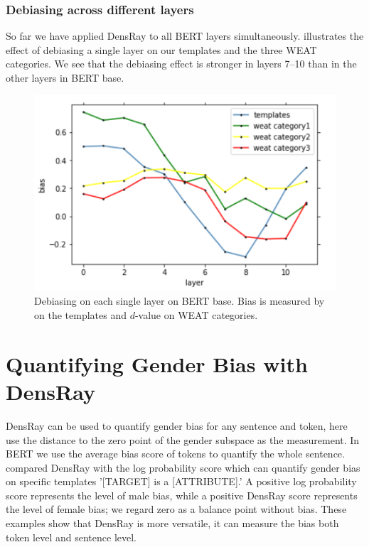 \subsubsection{Debiasing across different layers}
So far we have applied DensRay to all BERT layers simultaneously.
    illustrates the effect of
 debiasing a single  layer on our templates and the three
 WEAT categories. We see that the debiasing effect
is stronger in
layers 7--10  than in the other layers in BERT base.
\begin{figure}[h]
	\centering
	\includegraphics[width=0.5\linewidth]{layers_base}
	\caption{Debiasing on each single layer on BERT base. Bias is measured by  on the templates and $d$-value on WEAT categories.}
\end{figure}
\section{Quantifying Gender Bias with DensRay}
DensRay can be used to quantify gender bias for any sentence and token, here use the distance to the zero point of the gender subspace as the measurement. In BERT we use the average bias score of tokens to quantify the whole sentence.  compared DensRay with the log probability score \cite{kurita2019measuring} which can quantify gender bias on specific templates '[TARGET] is a [ATTRIBUTE].' A positive log probability score represents the level of male bias, while a positive DensRay score represents the level of female bias; we regard zero as a balance point without bias. These examples show that DensRay is more versatile, it can measure the bias both token level and sentence level.

